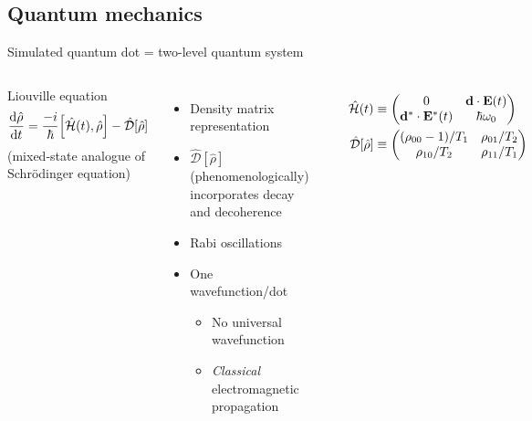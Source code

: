 \documentclass[aspectratio=169]{beamer}
\begin{document}
\subsection{Quantum mechanics}

\begin{frame}{Simulated quantum dot = two-level quantum system}
  \begin{columns}
      \begin{block}{Liouville equation}
        \begin{equation*}
          \dv{\hat{\rho}}{t} = \frac{-i}{\hbar} \commutator{\hat{\mathcal{H}}(t)}{\hat{\rho}} - \hat{\mathcal{D}}\qty[\hat{\rho}]
        \end{equation*}
        \hfill {\tiny(mixed-state analogue of Schr\"odinger equation)}
      \end{block}

      \begin{itemize}
        \item Density matrix representation
        \item $\hat{\mathcal{D}}[\hat{\rho}]$ (phenomenologically) incorporates decay and decoherence
        \item Rabi oscillations
        \item One wavefunction/dot
          \begin{itemize}
            \item No universal wavefunction
            \item \emph{Classical} electromagnetic propagation
          \end{itemize}
      \end{itemize}

      \begin{center}
        
      \end{center}

      \vspace{-1.0cm}
      \begin{align*}
        \hat{\mathcal{H}}(t) &\equiv \mqty(0 & \vb{d} \cdot \vb{E}(t) \\ \vb{d}^* \cdot \vb{E}^*(t) & \hbar \omega_0) \\
        \hat{\mathcal{D}}[\hat{\rho}] &\equiv \mqty( (\rho_{00} - 1)/T_1 & \rho_{01}/T_2 \\ \rho_{10}/T_2 & \rho_{11}/T_1)
      \end{align*}
  \end{columns}
\end{frame}
\end{document}
